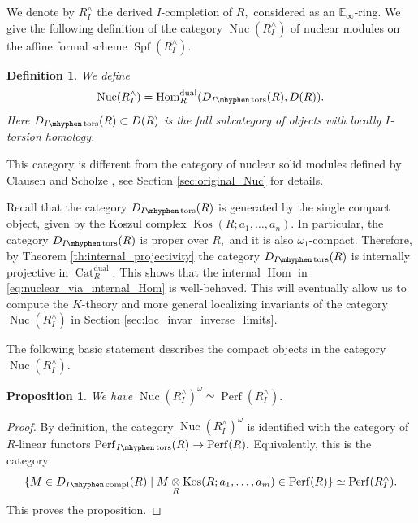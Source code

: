 \documentclass[11pt,leqno]{amsart}
\newtheorem{defi}[theo]{Definition}
\newtheorem{prop}[theo]{Proposition}
\numberwithin{equation}{section}
\def\Hom{\operatorname{Hom}}
\newcommand{\tens}[1]{%
  \mathbin{\mathop{\otimes}\displaylimits_{#1}}%
}
\newcommand{\hy}{\mhyphen}
\newcommand{\Nuc}{\operatorname{Nuc}}
\newcommand{\Cat}{\operatorname{Cat}}
\newcommand{\dual}{\operatorname{dual}}
\newcommand{\bE}{{\mathbb E}}
\newcommand{\un}{\underline}
\newcommand{\Perf}{\operatorname{Perf}}
\newcommand{\Kos}{\operatorname{Kos}}
\newcommand{\Spf}{\operatorname{Spf}}
\newcommand{\tors}{\operatorname{tors}}
\newcommand{\compl}{\operatorname{compl}}
\begin{document}
We denote by $R^{\wedge}_I$ the derived $I$-completion of $R,$ considered as an $\bE_{\infty}$-ring.  We give the following definition of the category $\Nuc(R^{\wedge}_{I})$ of nuclear modules on the affine formal scheme $\Spf(R^{\wedge}_I).$

\begin{defi}\label{def:nuclear_via_internal_Hom}
We define 
\begin{equation}\label{eq:nuclear_via_internal_Hom}
\Nuc(R^{\wedge}_I)=\un{\Hom}_R^{\dual}(D_{I\hy\tors}(R),D(R)).
\end{equation}
Here $D_{I\hy\tors}(R)\subset D(R)$ is the full subcategory of objects with locally $I$-torsion homology.
\end{defi}

This category is different from the category of nuclear solid modules defined by Clausen and Scholze \cite{CS20}, see Section \ref{sec:original_Nuc} for details.

Recall that the category $D_{I\hy\tors}(R)$ is generated by the single compact object, given by the Koszul complex $\Kos(R;a_1,\dots,a_n).$ In particular, the category $D_{I\hy\tors}(R)$ is proper over $R,$ and it is also $\omega_1$-compact. Therefore, by Theorem \ref{th:internal_projectivity} the category $D_{I\hy\tors}(R)$ is internally projective in $\Cat_R^{\dual}.$ This shows that the internal $\Hom$ in \eqref{eq:nuclear_via_internal_Hom} is well-behaved. This will eventually allow us to compute the $K$-theory and more general localizing invariants of the category $\Nuc(R^{\wedge}_I)$ in Section \ref{sec:loc_invar_inverse_limits}. 

The following basic statement describes the compact objects in the category $\Nuc(R^{\wedge}_I).$

\begin{prop}
We have $\Nuc(R^{\wedge}_I)^{\omega}\simeq \Perf(R^{\wedge}_I).$
\end{prop}

\begin{proof}
By definition, the category $\Nuc(R^{\wedge}_I)^{\omega}$ is identified with the category of $R$-linear functors $\Perf_{I\hy\tors}(R)\to\Perf(R).$ Equivalently, this is the category
\begin{equation*}
\{M\in D_{I\hy\compl}(R)\mid M\tens{R}\Kos(R;a_1,\dots,a_m)\in\Perf(R)\}\simeq \Perf(R^{\wedge}_I).
\end{equation*}
This proves the proposition.
\end{proof}
\end{document}
